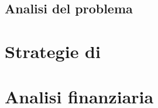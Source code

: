 \subsection{Analisi del problema}

\section{Strategie di \mktg}\label{sec:exitstrategy}

\section{Analisi finanziaria}

